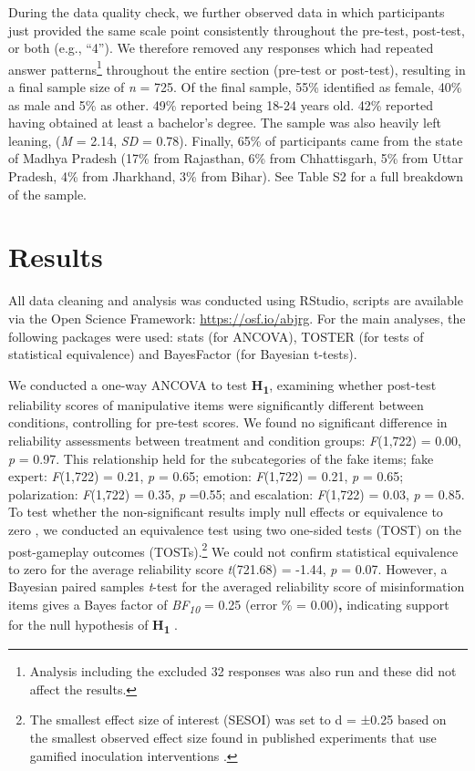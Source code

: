 \documentclass[empirical, authordate]{jote-new-article}
\begin{document}
During the data quality check, we further observed data in which participants just provided the same scale point consistently throughout the pre-test, post-test, or both (e.g., “4”). We therefore removed any responses which had repeated answer patterns\footnote{Analysis including the excluded 32 responses was also run and these did not affect the results.} throughout the entire section (pre-test or post-test), resulting in a final sample size of \emph{n} = 725. Of the final sample, 55\% identified as female, 40\% as male and 5\% as other. 49\% reported being 18-24 years old. 42\% reported having obtained at least a bachelor's degree. The sample was also heavily left leaning, (\emph{M} = 2.14, \emph{SD} = 0.78). Finally, 65\% of participants came from the state of Madhya Pradesh (17\% from Rajasthan, 6\% from Chhattisgarh, 5\% from Uttar Pradesh, 4\% from Jharkhand, 3\% from Bihar). See Table S2 for a full breakdown of the sample.

\section{Results }

All data cleaning and analysis was conducted using RStudio, scripts are available via the Open Science Framework: \url{https://osf.io/abjrg}. For the main analyses, the following packages were used: stats (for ANCOVA), TOSTER (for tests of statistical equivalence) and BayesFactor (for Bayesian t-tests).

We conducted a one-way ANCOVA to test \textbf{H}\textsubscript{\textbf{1}},\textbf{ }examining whether post-test reliability scores of manipulative items were significantly different between conditions, controlling for pre-test scores. We found no significant difference in reliability assessments between treatment and condition groups: \emph{F}(1,722) = 0.00, \emph{p} = 0.97. This relationship held for the subcategories of the fake items; fake expert: \emph{F}(1,722) = 0.21, \emph{p }= 0.65; emotion: \emph{F}(1,722) = 0.21, \emph{p }= 0.65; polarization: \emph{F}(1,722) = 0.35, \emph{p }=0.55; and escalation: \emph{F}(1,722) = 0.03, \emph{p} = 0.85. To test whether the non-significant results imply null effects or equivalence to zero \parencite{Lakens2018}, we conducted an equivalence test using two one-sided tests (TOST) on the post-gameplay outcomes (TOSTs).\footnote{The smallest effect size of interest (SESOI) was set to d = ±0.25 based on the smallest observed effect size found in published experiments that use gamified inoculation interventions \parencite{Roozenbeek2019}.} We could not confirm statistical equivalence to zero for the average reliability score \emph{t}(721.68) = -1.44, \emph{p} = 0.07. However, a Bayesian paired samples \emph{t}-test for the averaged reliability score of misinformation items gives a Bayes factor of \emph{BF}\textsubscript{\emph{10 }}= 0.25 (error \% = 0.00)\textbf{,} indicating support for the null hypothesis of \textbf{H}\textsubscript{\textbf{1}} \parencite{Dienes2014}.
\end{document}
